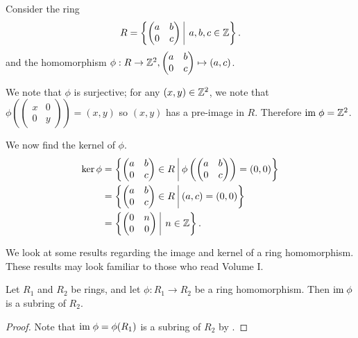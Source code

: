 \begin{example}
    Consider the ring
    \[
        R = \left\{\begin{pmatrix}a&b\\0&c\end{pmatrix}\vert a,b,c\in\Z\right\}.
    \]
    and the homomorphism $\phi: R \to \mathbb{Z}^2, \begin{pmatrix}a&b\\0&c\end{pmatrix} \mapsto (a,c)$.

    We note that $\phi$ is surjective; for any $(x,y)\in\mathbb{Z}^2$, we note that $\phi\left(\begin{pmatrix}x&0\\0&y\end{pmatrix}\right) = (x,y)$ so $(x,y)$ has a pre-image in $R$. Therefore $\mathrm{im}\; \phi = \mathbb{Z}^2$.

    We now find the kernel of $\phi$.
    \begin{align*}
        \ker\phi &= \left\{\begin{pmatrix}a&b\\0&c\end{pmatrix} \in R \vert \phi\left(\begin{pmatrix}a&b\\0&c\end{pmatrix}\right) = (0,0)\right\}\\
        &= \left\{\begin{pmatrix}a&b\\0&c\end{pmatrix} \in R \vert (a,c) = (0,0)\right\}\\
        &= \left\{\begin{pmatrix}0&n\\0&0\end{pmatrix} \vert n \in \Z\right\}.
    \end{align*}
\end{example}

We look at some results regarding the image and kernel of a ring homomorphism. These results may look familiar to those who read Volume I.
\begin{proposition}\label{prop-image-is-a-subring}
    Let $R_1$ and $R_2$ be rings, and let $\phi: R_1 \to R_2$ be a ring homomorphism. Then $\mathrm{im}\;\phi$ is a subring of $R_2$.
\end{proposition}
\begin{proof}
    Note that $\mathrm{im}\;\phi = \phi(R_1)$ is a subring of $R_2$ by .
\end{proof}

